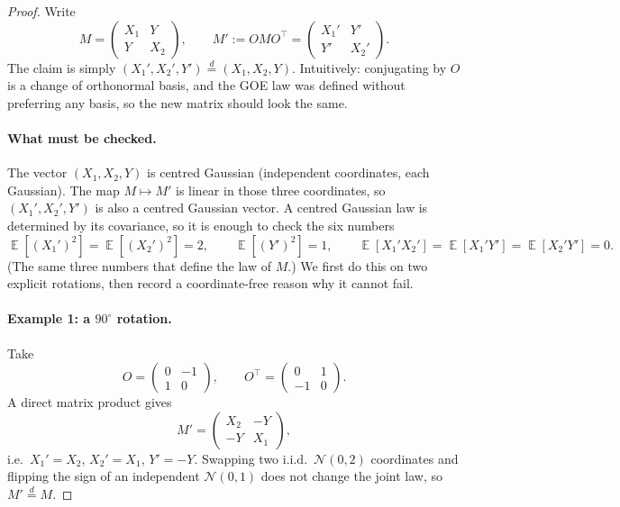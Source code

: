 \documentclass[11pt,a4paper]{article}
\DeclareMathOperator{\E}{\mathbb{E}}
\begin{document}
\begin{proof}
Write
\[
M
=
\begin{pmatrix} X_1 & Y \\ Y & X_2 \end{pmatrix},
\qquad
M'
:=
OMO^\top
=
\begin{pmatrix} X_1' & Y' \\ Y' & X_2' \end{pmatrix}.
\]
The claim is simply \((X_1',X_2',Y')\stackrel{d}{=}(X_1,X_2,Y)\). Intuitively: conjugating by \(O\) is a change of orthonormal basis, and the GOE law was defined without preferring any basis, so the new matrix should look the same.

\paragraph{What must be checked.}
The vector \((X_1,X_2,Y)\) is centred Gaussian (independent coordinates, each Gaussian). The map \(M\mapsto M'\) is linear in those three coordinates, so \((X_1',X_2',Y')\) is also a centred Gaussian vector. A centred Gaussian law is determined by its covariance, so it is enough to check the six numbers
\[
\E[(X_1')^2]=\E[(X_2')^2]=2,
\qquad
\E[(Y')^2]=1,
\qquad
\E[X_1'X_2']=\E[X_1'Y']=\E[X_2'Y']=0.
\]
(The same three numbers that define the law of \(M\).) We first do this on two explicit rotations, then record a coordinate-free reason why it cannot fail.

\paragraph{Example 1: a \(90^\circ\) rotation.}
Take
\[
O
=
\begin{pmatrix} 0 & -1 \\ 1 & 0 \end{pmatrix},
\qquad
O^\top
=
\begin{pmatrix} 0 & 1 \\ -1 & 0 \end{pmatrix}.
\]
A direct matrix product gives
\[
M'
=
\begin{pmatrix} X_2 & -Y \\ -Y & X_1 \end{pmatrix},
\]
i.e.\ \(X_1'=X_2\), \(X_2'=X_1\), \(Y'=-Y\). Swapping two i.i.d.\ \(\mathcal{N}(0,2)\) coordinates and flipping the sign of an independent \(\mathcal{N}(0,1)\) does not change the joint law, so \(M'\stackrel{d}{=}M\).


\end{proof}
\end{document}
